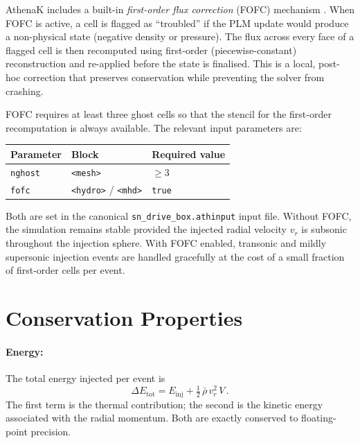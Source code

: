 \documentclass[11pt]{article}
\begin{document}
AthenaK includes a built-in \emph{first-order flux correction} (FOFC) mechanism
\citep[see][]{Lemaster2009,Stone2020}.  When FOFC is active, a cell is flagged
as ``troubled'' if the PLM update would produce a non-physical state (negative
density or pressure).  The flux across every face of a flagged cell is then
recomputed using first-order (piecewise-constant) reconstruction and re-applied
before the state is finalised.  This is a local, post-hoc correction that
preserves conservation while preventing the solver from crashing.

FOFC requires at least three ghost cells so that the stencil for the
first-order recomputation is always available.  The relevant input parameters
are:

\begin{center}
\begin{tabular}{@{}lll@{}}
\toprule
Parameter & Block & Required value \\
\midrule
\texttt{nghost}  & \texttt{<mesh>}  & $\geq 3$ \\
\texttt{fofc}    & \texttt{<hydro>} / \texttt{<mhd>} & \texttt{true} \\
\bottomrule
\end{tabular}
\end{center}

Both are set in the canonical \texttt{sn\_drive\_box.athinput} input file.
Without FOFC, the simulation remains stable provided the injected radial
velocity $v_r$ is subsonic throughout the injection sphere.  With FOFC
enabled, transonic and mildly supersonic injection events are handled
gracefully at the cost of a small fraction of first-order cells per event.

\section{Conservation Properties}

\paragraph{Energy:} The total energy injected per event is
\begin{equation}
  \Delta E_\mathrm{tot} = E_\mathrm{inj} + \tfrac{1}{2}\,\bar{\rho}\,v_r^2\,V\,.
\end{equation}
The first term is the thermal contribution; the second is the kinetic energy
associated with the radial momentum.  Both are exactly conserved to
floating-point precision.
\end{document}
